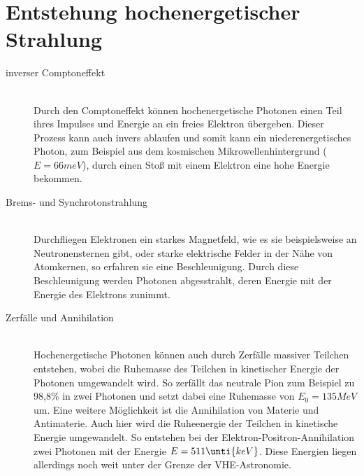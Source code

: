 \section{Entstehung hochenergetischer Strahlung}
\begin{description}
\item[inverser Comptoneffekt]\hfill \\
Durch den Comptoneffekt können hochenergetische Photonen einen Teil ihres Impulses und Energie an ein freies Elektron übergeben. Dieser Prozess kann auch invers ablaufen und somit kann ein niederenergetisches Photon, zum Beispiel aus dem kosmischen Mikrowellenhintergrund ($E=66\unit{meV}$), durch einen Stoß mit einem Elektron eine hohe Energie bekommen.
\item[Brems- und Synchrotonstrahlung]\hfill \\
Durchfliegen Elektronen ein starkes Magnetfeld, wie es sie beispielsweise an Neutronensternen gibt, oder starke elektrische Felder in der Nähe von Atomkernen, so erfahren sie eine Beschleunigung. Durch diese Beschleunigung werden Photonen abgesstrahlt, deren Energie mit der Energie des Elektrons zunimmt.
\item[Zerfälle und Annihilation]\hfill \\ 
Hochenergetische Photonen können auch durch Zerfälle massiver Teilchen entstehen, wobei die Ruhemasse des Teilchen in kinetischer Energie der Photonen umgewandelt wird. So zerfällt das neutrale Pion zum Beispiel zu 98,8\%  in zwei Photonen und setzt dabei eine Ruhemasse von $E_0=135\unit{MeV}$ \cite{PDG} um. Eine weitere Möglichkeit ist die Annihilation von Materie und Antimaterie. Auch hier wird die Ruheenergie der Teilchen in kinetische Energie umgewandelt. So entstehen bei der Elektron-Positron-Annihilation zwei Photonen mit der Energie $E=511\unti{keV}$.
Diese Energien liegen allerdings noch weit unter der Grenze der VHE-Astronomie.
\end{description}

